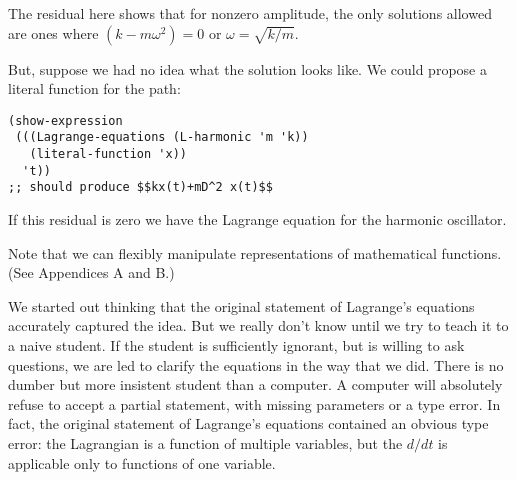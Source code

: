 \documentclass[11pt]{article}
\begin{document}
The residual here shows that for nonzero amplitude, the only solutions allowed
are ones where \((k - m\omega^2) = 0\) or \(\omega = \sqrt{k/m}\).

But, suppose we had no idea what the solution looks like. We could propose a
literal function for the path:

\begin{verbatim}
(show-expression
 (((Lagrange-equations (L-harmonic 'm 'k))
   (literal-function 'x))
  't))
;; should produce $$kx(t)+mD^2 x(t)$$
\end{verbatim}

If this residual is zero we have the Lagrange equation for the harmonic
oscillator.

Note that we can flexibly manipulate representations of mathematical functions.
(See Appendices A and B.)

We started out thinking that the original statement of Lagrange’s equations
accurately captured the idea. But we really don’t know until we try to teach it
to a naive student. If the student is sufficiently ignorant, but is willing to
ask questions, we are led to clarify the equations in the way that we did. There
is no dumber but more insistent student than a computer. A computer will
absolutely refuse to accept a partial statement, with missing parameters or a
type error. In fact, the original statement of Lagrange’s equations contained an
obvious type error: the Lagrangian is a function of multiple variables, but the
\(d/dt\) is applicable only to functions of one variable.
\end{document}
